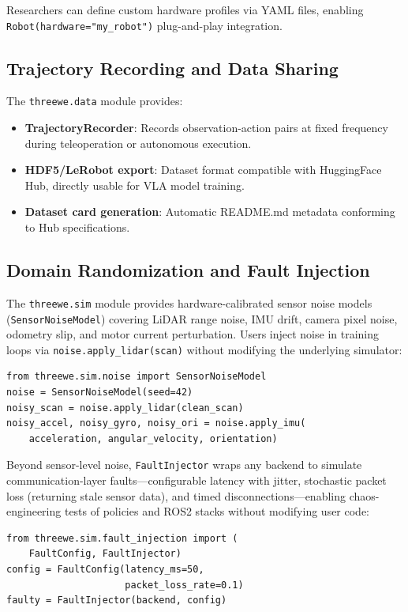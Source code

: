 \documentclass[conference]{IEEEtran}
\begin{document}
Researchers can define custom hardware profiles via YAML files, enabling \texttt{Robot(hardware="my\_robot")} plug-and-play integration.

\subsection{Trajectory Recording and Data Sharing}

The \texttt{threewe.data} module provides:
\begin{itemize}
    \item \textbf{TrajectoryRecorder}: Records observation-action pairs at fixed frequency during teleoperation or autonomous execution.
    \item \textbf{HDF5/LeRobot export}: Dataset format compatible with HuggingFace Hub, directly usable for VLA model training.
    \item \textbf{Dataset card generation}: Automatic README.md metadata conforming to Hub specifications.
\end{itemize}

\subsection{Domain Randomization and Fault Injection}

The \texttt{threewe.sim} module provides hardware-calibrated sensor noise models (\texttt{SensorNoiseModel}) covering LiDAR range noise, IMU drift, camera pixel noise, odometry slip, and motor current perturbation. Users inject noise in training loops via \texttt{noise.apply\_lidar(scan)} without modifying the underlying simulator:

\begin{lstlisting}
from threewe.sim.noise import SensorNoiseModel
noise = SensorNoiseModel(seed=42)
noisy_scan = noise.apply_lidar(clean_scan)
noisy_accel, noisy_gyro, noisy_ori = noise.apply_imu(
    acceleration, angular_velocity, orientation)
\end{lstlisting}

Beyond sensor-level noise, \texttt{FaultInjector} wraps any backend to simulate communication-layer faults---configurable latency with jitter, stochastic packet loss (returning stale sensor data), and timed disconnections---enabling chaos-engineering tests of policies and ROS2 stacks without modifying user code:

\begin{lstlisting}
from threewe.sim.fault_injection import (
    FaultConfig, FaultInjector)
config = FaultConfig(latency_ms=50,
                     packet_loss_rate=0.1)
faulty = FaultInjector(backend, config)
\end{lstlisting}
\end{document}
